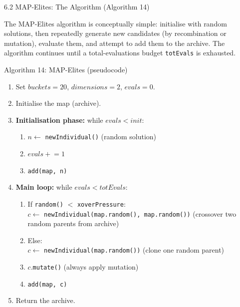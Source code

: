 \documentclass[aspectratio=169,10pt]{beamer}
\begin{document}
\begin{frame}[allowframebreaks]{6.2 MAP-Elites: The Algorithm (Algorithm 14)}

The MAP-Elites algorithm is conceptually simple: initialise with
random solutions, then repeatedly generate new candidates (by
recombination or mutation), evaluate them, and attempt to add them
to the archive.
The algorithm continues until a total-evaluations budget
\texttt{totEvals} is exhausted.

\medskip
\begin{block}{Algorithm 14: MAP-Elites (pseudocode)}
\begin{enumerate}
  \item Set $buckets = 20$, $dimensions = 2$, $evals = 0$.
  \item Initialise the map (archive).
  \item \textbf{Initialisation phase:} while $evals < init$:
    \begin{enumerate}
      \item $n \leftarrow$ \texttt{newIndividual()} \quad (random solution)
      \item $evals \mathrel{+}= 1$
      \item \texttt{add(map, n)}
    \end{enumerate}
  \item \textbf{Main loop:} while $evals < totEvals$:
    \begin{enumerate}
      \item If \texttt{random()} $<$ \texttt{xoverPressure}: \\
            $c \leftarrow$ \texttt{newIndividual(map.random(), map.random())}
            \quad (crossover two random parents from archive)
      \item Else: \\
            $c \leftarrow$ \texttt{newIndividual(map.random())}
            \quad (clone one random parent)
      \item $c$.\texttt{mutate()} \quad (always apply mutation)
      \item \texttt{add(map, c)}
    \end{enumerate}
  \item Return the archive.
\end{enumerate}
\end{block}

\framebreak


\end{frame}
\end{document}
